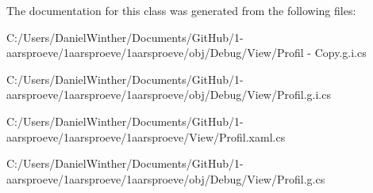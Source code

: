 The documentation for this class was generated from the following files\+:\begin{DoxyCompactItemize}
\item 
C\+:/\+Users/\+Daniel\+Winther/\+Documents/\+Git\+Hub/1-\/aarsproeve/1aarsproeve/1aarsproeve/obj/\+Debug/\+View/Profil -\/ Copy.\+g.\+i.\+cs\item 
C\+:/\+Users/\+Daniel\+Winther/\+Documents/\+Git\+Hub/1-\/aarsproeve/1aarsproeve/1aarsproeve/obj/\+Debug/\+View/Profil.\+g.\+i.\+cs\item 
C\+:/\+Users/\+Daniel\+Winther/\+Documents/\+Git\+Hub/1-\/aarsproeve/1aarsproeve/1aarsproeve/\+View/Profil.\+xaml.\+cs\item 
C\+:/\+Users/\+Daniel\+Winther/\+Documents/\+Git\+Hub/1-\/aarsproeve/1aarsproeve/1aarsproeve/obj/\+Debug/\+View/Profil.\+g.\+cs\end{DoxyCompactItemize}
